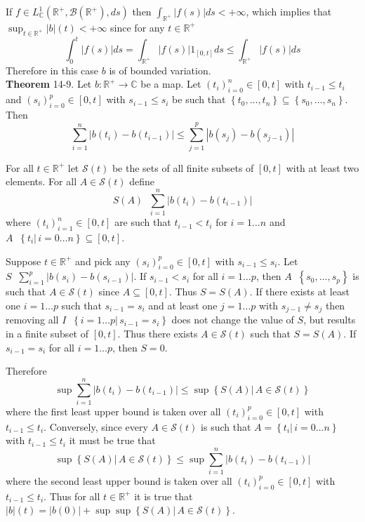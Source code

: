 \documentclass[a4paper]{article}
\newcommand{\obj}[1]{\left\{ #1 \right \}}
\newcommand{\clo}[1]{\left [ #1 \right ]}
\newcommand{\brac}[1]{\left ( #1 \right )}
\newcommand{\induc}[1]{\left . #1 \right \vert}
\newcommand{\abs}[1]{\left | #1 \right |}
\newcommand{\Real}{\mathbb{R}}
\newcommand{\Cplx}{\mathbb{C}}
\newcommand{\Scal}{\mathcal{S}}
\newcommand{\borel}[1]{\mathcal{B}\brac{#1}}
\newcommand{\defn}{\mathop{\overset{\Delta}{=}}\nolimits}
\begin{document}
If $f\in L^1_\Cplx\brac{\Real^+,\borel{\Real^+},ds}$ then $\int_{\Real^+} \abs{f\brac{s}}ds <+\infty$, which implies that $\sup_{t\in \Real^+}\abs{b}\brac{t}<+\infty$ since for any $t\in \Real^+$\[\int_0^t\abs{f\brac{s}}ds = \int_{\Real^+}\abs{f\brac{s}} 1_{\clo{0,t}}ds \leq \int_{\Real^+}\abs{f\brac{s}}ds\] Therefore in this case $b$ is of bounded variation.\\

\label{thm:tot_var_sum_prop}\noindent\textbf{Theorem} 14-9.
Let $b:\Real^+\to\Cplx$ be a map. Let $\brac{t_i}_{i=0}^n\in\clo{0,t}$ with $t_{i-1}\leq t_i$ and $\brac{s_i}_{i=0}^p\in\clo{0,t}$ with $s_{i-1}\leq s_i$ be such that $\obj{t_0,\ldots, t_n}\subseteq \obj{s_0,\ldots, s_n}$. Then \[\sum_{i=1}^n\abs{b\brac{t_i}-b\brac{t_{i-1}}}\leq \sum_{j=1}^p\abs{b\brac{s_j}-b\brac{s_{j-1}}}\]

For all $t\in \Real^+$ let $\Scal\brac{t}$ be the sets of all finite subsets of $\clo{0,t}$ with at least two elements. For all $A\in \Scal\brac{t}$ define \[S\brac{A}\defn \sum_{i=1}^n \abs{b\brac{t_i} - b\brac{t_{i-1}}}\] where $\brac{t_i}_{i=1}^n\in\clo{0,t}$ are such that $t_{i-1}< t_i$ for $i=1\ldots n$ and $A\defn \obj{\induc{t_i}\,i=0\ldots n}\subseteq \clo{0,t}$.

Suppose $t\in \Real^+$ and pick any $\brac{s_i}_{i=0}^p\in\clo{0,t}$ with $s_{i-1}\leq s_i$. Let $S\defn \sum_{i=1}^p \abs{b\brac{s_i}-b\brac{s_{i-1}}}$. If $s_{i-1}<s_i$ for all $i=1\ldots p$, then $A\defn \obj{s_0,\ldots,s_p}$ is such that $A\in \Scal\brac{t}$ since $A\subseteq \clo{0,t}$. Thus $S=S\brac{A}$.
If there exists at least one $i=1\ldots p$ such that $s_{i-1}=s_i$ and at least one $j=1\ldots p$ with $s_{j-1}\neq s_j$ then removing all $I\defn \obj{\induc{i=1\ldots p}\,s_{i-1}=s_i}$ does not change the value of $S$, but results in a finite subset of $\clo{0,t}$. Thus there exists $A\in \Scal\brac{t}$ such that $S=S\brac{A}$. If $s_{i-1}=s_i$ for all $i=1\ldots p$, then $S=0$.

Therefore \[\sup \sum_{i=1}^n \abs{b\brac{t_i}-b\brac{t_{i-1}}}\leq \sup\obj{\induc{S\brac{A}}\,A\in \Scal\brac{t}}\] where the first least upper bound is taken over all $\brac{t_i}_{i=0}^p\in\clo{0,t}$ with $t_{i-1}\leq t_i$. Conversely, since every $A\in \Scal\brac{t}$ is such that $A=\obj{\induc{t_i}\,i=0\ldots n}$ with $t_{i-1}\leq t_i$ it must be true that \[\sup\obj{\induc{S\brac{A}}\,A\in \Scal\brac{t}}\leq \sup \sum_{i=1}^n \abs{b\brac{t_i}-b\brac{t_{i-1}}}\] where the second least upper bound is taken over all $\brac{t_i}_{i=0}^p\in\clo{0,t}$ with $t_{i-1}\leq t_i$. Thus for all $t\in\Real^+$ it is true that $\abs{b}\brac{t} = \abs{b\brac{0}}+\sup\sup\obj{\induc{S\brac{A}}\,A\in \Scal\brac{t}}$.
\end{document}
